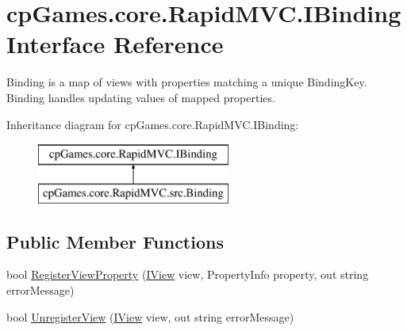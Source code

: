 \hypertarget{interfacecp_games_1_1core_1_1_rapid_m_v_c_1_1_i_binding}{}\section{cp\+Games.\+core.\+Rapid\+M\+V\+C.\+I\+Binding Interface Reference}
\label{interfacecp_games_1_1core_1_1_rapid_m_v_c_1_1_i_binding}


Binding is a map of views with properties matching a unique Binding\+Key. Binding handles updating values of mapped properties.  


Inheritance diagram for cp\+Games.\+core.\+Rapid\+M\+V\+C.\+I\+Binding\+:\begin{figure}[H]
\begin{center}
\leavevmode
\includegraphics[height=2.000000cm]{interfacecp_games_1_1core_1_1_rapid_m_v_c_1_1_i_binding}
\end{center}
\end{figure}
\subsection*{Public Member Functions}
\begin{DoxyCompactItemize}
\item 
bool \mbox{\hyperlink{interfacecp_games_1_1core_1_1_rapid_m_v_c_1_1_i_binding_a600504a6b8ba86a81e02ef03c4dc9e53}{Register\+View\+Property}} (\mbox{\hyperlink{interfacecp_games_1_1core_1_1_rapid_m_v_c_1_1_i_view}{I\+View}} view, Property\+Info property, out string error\+Message)
\item 
bool \mbox{\hyperlink{interfacecp_games_1_1core_1_1_rapid_m_v_c_1_1_i_binding_ab36c868f3a9163935a650c30663f7a97}{Unregister\+View}} (\mbox{\hyperlink{interfacecp_games_1_1core_1_1_rapid_m_v_c_1_1_i_view}{I\+View}} view, out string error\+Message)
\end{DoxyCompactItemize}
